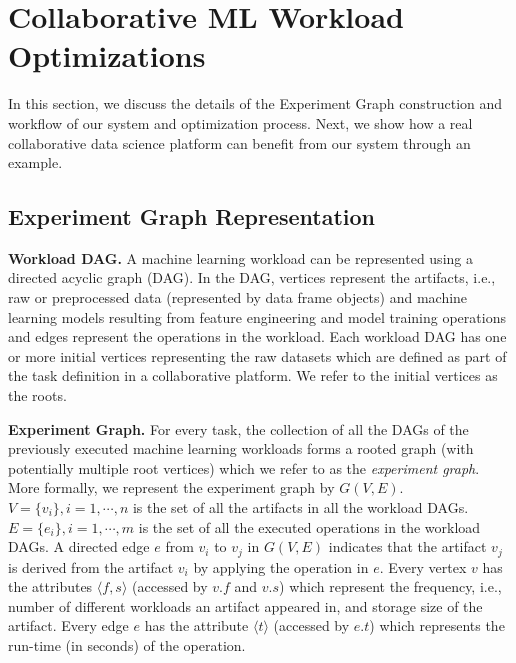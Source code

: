 \section{Collaborative ML Workload Optimizations} \label{sec-ml-workloads}
In this section, we discuss the details of the Experiment Graph construction and workflow of our system and optimization process.
Next, we show how a real collaborative data science platform can benefit from our system through an example.

\subsection{Experiment Graph Representation}\label{sub-graph-construction}
\textbf{Workload DAG.}
A machine learning workload can be represented using a directed acyclic graph (DAG).
In the DAG, vertices represent the artifacts, i.e., raw or preprocessed data (represented by data frame objects) and machine learning models resulting from feature engineering and model training operations and edges represent the operations in the workload.
Each workload DAG has one or more initial vertices representing the raw datasets which are defined as part of the task definition in a collaborative platform.
We refer to the initial vertices as the roots.

\textbf{Experiment Graph. }
For every task, the collection of all the DAGs of the previously executed machine learning workloads forms a rooted graph (with potentially multiple root vertices) which we refer to as the \textit{experiment graph}.
More formally, we represent the experiment graph by $G(V, E)$.
$V=\{v_i\}, i = 1, \cdots, n$ is the set of all the artifacts in all the workload DAGs.
$E=\{e_i\}, i = 1, \cdots, m$ is the set of all the executed operations in the workload DAGs.
A directed edge $e$ from $v_i$ to $v_j$ in $G(V, E)$ indicates that the artifact $v_j$ is derived from the artifact $v_i$ by applying the operation in $e$.
Every vertex $v$ has the attributes $\langle f, s \rangle$ (accessed by $v.f$ and $v.s$) which represent the frequency, i.e., number of different workloads an artifact appeared in, and storage size of the artifact.
Every edge $e$ has the attribute $\langle t \rangle$ (accessed by $e.t$) which represents the run-time (in seconds) of the operation.

